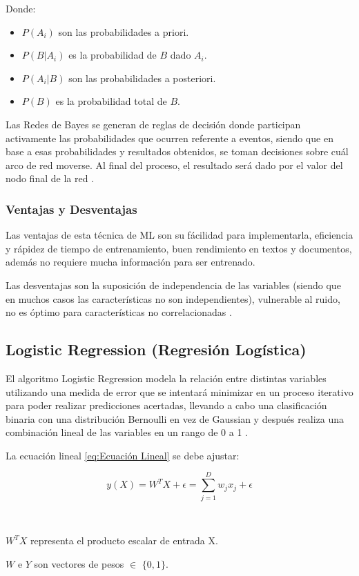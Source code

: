 Donde:
\begin{itemize}
	\item $P(A_{i})$ son las probabilidades a priori.
	\item $P(B|A_{i})$ es la probabilidad de $B$ dado $A_{i}$.
	\item $P(A_{i}|B)$ son las probabilidades a posteriori.
	\item $P(B)$ es la probabilidad total de $B$.
\end{itemize}


\par Las Redes de Bayes se generan de reglas de decisión donde participan activamente las probabilidades que ocurren referente a eventos, siendo que en base a esas probabilidades y resultados obtenidos, se toman decisiones sobre cuál arco de red moverse. Al final del proceso, el resultado será dado por el valor del nodo final de la red \cite{Bell15}.\\


\doublespacing
\subsubsection{Ventajas y Desventajas}
Las ventajas de esta técnica de ML son su fácilidad para implementarla, eficiencia y rápidez de tiempo de entrenamiento, buen rendimiento en textos y documentos, además no requiere mucha información para ser entrenado.\\
\par Las desventajas son la suposición de independencia de las variables (siendo que en muchos casos las características no son independientes), vulnerable al ruido, no es óptimo para características no correlacionadas \cite{Bell15}.

\doublespacing
\subsection{Logistic Regression (Regresión Logística)}
\label{sec:LR}
El algoritmo Logistic Regression modela la relación entre distintas variables utilizando una medida de error que se intentará minimizar en un proceso iterativo para poder realizar predicciones acertadas, llevando a cabo una clasificación binaria con una distribución Bernoulli en vez de Gaussian y después realiza una combinación lineal de las variables en un rango de 0 a 1 \cite{ Stoltzfus2011}.\\
\par La ecuación lineal \ref{eq:Ecuación Lineal} se debe ajustar:\\
\begin{Large}
	\begin{equation}
		y(X)=W^{T}X + \epsilon = \sum_{j=1}^{D}w_{j}x_{j} + \epsilon
		\label{eq:Ecuación Lineal}
	\end{equation}
\end{Large}\\ 
\par $W^{T}X$ representa el producto escalar de entrada X.
\par $W$ e $Y$ son vectores de pesos $\in$ $\lbrace 0,1 \rbrace$.\\

